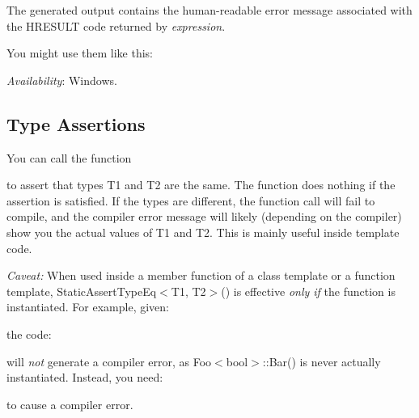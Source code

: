 The generated output contains the human-\/readable error message associated with the {\ttfamily H\+R\+E\+S\+U\+LT} code returned by {\itshape expression}.

You might use them like this\+:


\begin{DoxyCode}{0}
\end{DoxyCode}


{\itshape Availability}\+: Windows.

\subsection*{Type Assertions}

You can call the function 
\begin{DoxyCode}{0}
\end{DoxyCode}
 to assert that types {\ttfamily T1} and {\ttfamily T2} are the same. The function does nothing if the assertion is satisfied. If the types are different, the function call will fail to compile, and the compiler error message will likely (depending on the compiler) show you the actual values of {\ttfamily T1} and {\ttfamily T2}. This is mainly useful inside template code.

{\itshape Caveat\+:} When used inside a member function of a class template or a function template, {\ttfamily Static\+Assert\+Type\+Eq$<$T1, T2$>$()} is effective {\itshape only if} the function is instantiated. For example, given\+: 
\begin{DoxyCode}{0}
\DoxyCodeLine{\};}
\end{DoxyCode}
 the code\+: 
\begin{DoxyCode}{0}
\end{DoxyCode}
 will {\itshape not} generate a compiler error, as {\ttfamily Foo$<$bool$>$\+::\+Bar()} is never actually instantiated. Instead, you need\+: 
\begin{DoxyCode}{0}
\end{DoxyCode}
 to cause a compiler error.

